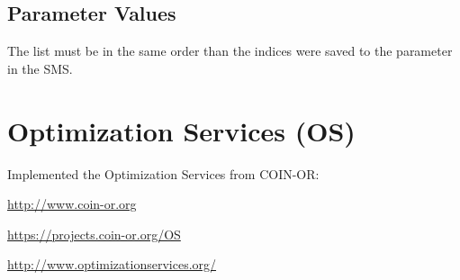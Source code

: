\documentclass[a4paper]{article}
\begin{document}
\subsection{Parameter Values}

The list must be in the same order than the indices were saved to the parameter
in the SMS.

\appendix
\section{Optimization Services (OS)}
Implemented the Optimization Services from COIN-OR:

\url{http://www.coin-or.org}

\url{https://projects.coin-or.org/OS}

\url{http://www.optimizationservices.org/}
\end{document}
